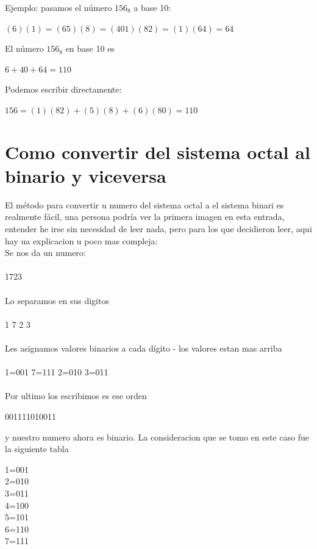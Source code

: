 \documentclass{article}
\begin{document}
\begin{multicols}{2}
Ejemplo: pasamos el número $156_{8}$ a base 10:
\begin{center}
$(6)(1)=(65)(8)=(401)(82)=(1)(64)=64$
\end{center}
El número $156_{8}$ en base 10 es
\\
\begin{center}
$6+40+64=110$
\end{center}
Podemos escribir directamente:
\begin{center}
$156=(1)(82)+(5)(8)+(6)(80)=110$
\end{center}
\section{Como convertir del sistema octal al binario y viceversa}
\label{sec:Como}
El método para convertir u numero del sistema octal a el sistema binari es realmente fácil, una persona podría ver la primera imagen en esta entrada, entender he irse sin necesidad de leer nada, pero para los que decidieron leer, aqui hay ua explicacion u poco mas compleja:
\\
Se nos da un numero:
\\
\\
1723
\\
\\
Lo separamos en sus digitos
\\
\\
1       7       2       3
\\
\\
Les asignamos valores binarios a cada dígito - los valores estan mas arriba
\\
\\
1=001 7=111 2=010 3=011
\\
\\
Por ultimo los escribimos es ese orden
\\
\begin{center}
001111010011
\end{center}
y nuestro numero ahora es binario.
La consideracion que se tomo en este caso fue la siguiente tabla
\begin{center}
1=001
\\
2=010
\\
3=011
\\
4=100
\\
5=101
\\
6=110
\\
7=111

\end{center}

\end{multicols}
\end{document}
